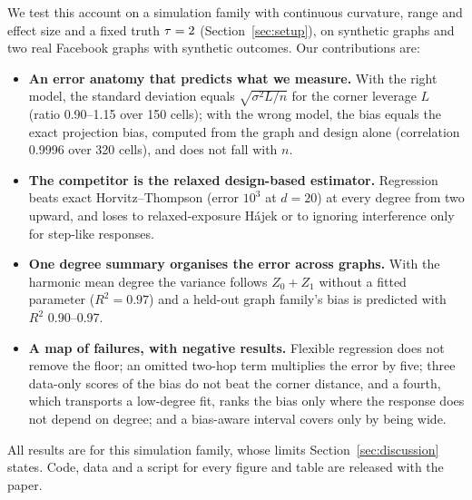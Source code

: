 We test this account on a simulation family with continuous curvature, range and effect size and a fixed truth $\tau=2$ (Section~\ref{sec:setup}), on synthetic graphs and two real Facebook graphs with synthetic outcomes. Our contributions are:
\begin{itemize}
\item \textbf{An error anatomy that predicts what we measure.} With the right model, the standard deviation equals $\sqrt{\sigma^2L/n}$ for the corner leverage $L$ (ratio 0.90--1.15 over 150 cells); with the wrong model, the bias equals the exact projection bias, computed from the graph and design alone (correlation 0.9996 over 320 cells), and does not fall with $n$.
\item \textbf{The competitor is the relaxed design-based estimator.} Regression beats exact Horvitz--Thompson (error $10^3$ at $d=20$) at every degree from two upward, and loses to relaxed-exposure Hájek or to ignoring interference only for step-like responses.
\item \textbf{One degree summary organises the error across graphs.} With the harmonic mean degree the variance follows $Z_0+Z_1$ without a fitted parameter ($R^2=0.97$) and a held-out graph family's bias is predicted with $R^2$ 0.90--0.97.
\item \textbf{A map of failures, with negative results.} Flexible regression does not remove the floor; an omitted two-hop term multiplies the error by five; three data-only scores of the bias do not beat the corner distance, and a fourth, which transports a low-degree fit, ranks the bias only where the response does not depend on degree; and a bias-aware interval covers only by being wide.
\end{itemize}
All results are for this simulation family, whose limits Section~\ref{sec:discussion} states. Code, data and a script for every figure and table are released with the paper.
